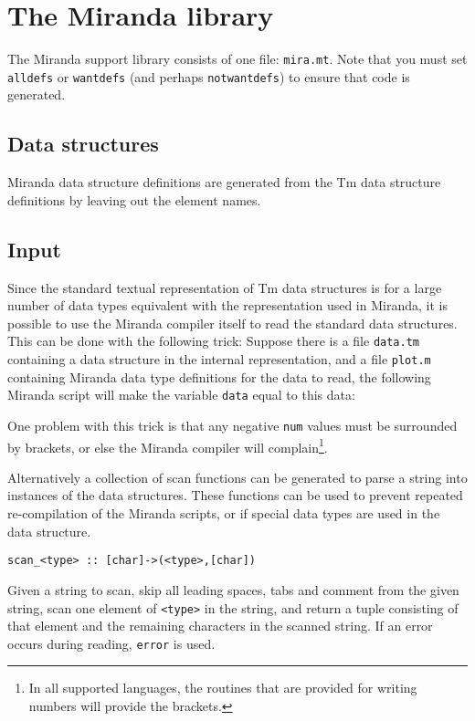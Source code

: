 \documentclass{article}
\def\Tm{{\sf Tm}}
\def\Miranda{Miranda}
\newenvironment{listing}{\small\begin{flushleft}}{\end{flushleft}}
\newenvironment{desc}{\nopagebreak\vspace{-\bigskipamount}\vspace{-\parskip}\begin{list}{}{\setlength{\topsep}{0pt}\setlength{\rightmargin}{0pt}}\item[]}{\end{list}}
\begin{document}
\section{The Miranda library}
\label{sec:miralib}
The {\Miranda} support library consists of one file: {\tt mira.mt}.
Note that you must set {\tt alldefs} or {\tt wantdefs} (and perhaps
{\tt notwantdefs}) to ensure that code is generated.
\subsection{Data structures}
{\Miranda} data structure definitions are generated from the {\Tm}
data structure definitions by leaving out the element names.
\subsection{Input}
Since the standard textual representation of {\Tm} data structures is
for a large number of data types equivalent with the representation used
in {\Miranda},
it is possible to use the {\Miranda} compiler itself to read the
standard data structures.
This can be done with the following trick:
Suppose there is a file {\tt data.tm} containing a data structure in the
internal representation,
and a file {\tt plot.m} containing {\Miranda} data type definitions
for the data to read,
the following {\Miranda} script will make the variable {\tt data}
equal to this data:
\begin{listing}

\end{listing}
\par
One problem with this trick is that any negative {\tt num} values
must be surrounded by brackets,
or else the {\Miranda} compiler will complain\footnote{
In all supported languages, the routines that are provided for writing
numbers will provide the brackets.
}.
\par
Alternatively a collection of scan functions can be generated to parse
a string into instances of the data structures.
These functions can be used to prevent repeated re-compilation of the
{\Miranda} scripts,
or if special data types are used in the data structure.
\begin{verbatim}
scan_<type> :: [char]->(<type>,[char])
\end{verbatim}
\begin{desc}
Given a string to scan,
skip all leading spaces, tabs and comment from the given string,
scan one element of {\tt <type>} in the string,
and return a tuple consisting of that element and the remaining characters
in the scanned string.
If an error occurs during reading, {\tt error} is used.
\end{desc}
\end{document}
